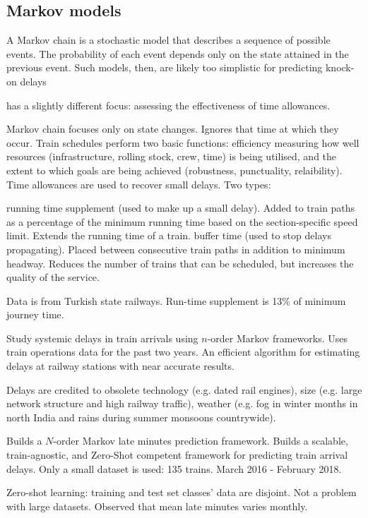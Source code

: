 \documentclass{article}
\begin{document}
\subsection{Markov models}

A Markov chain is a stochastic model that describes a sequence of possible events. The probability of each event depends only on the state attained in the previous event.
Such models, then, are likely too simplistic for predicting knock-on delays

\cite{sahin_et_al} has a slightly different focus: assessing the effectiveness of time allowances.

Markov chain focuses only on state changes. Ignores that time at which they occur. Train schedules perform two basic functions: efficiency measuring how well resources (infrastructure, rolling stock, crew, time) is being utilised, and the extent to which goals are being achieved (robustness, punctuality, relaibility). Time allowances are used to recover small delays. Two types:

running time supplement (used to make up a small delay). Added to train paths as a percentage of the minimum running time based on the section-specific speed limit. Extends the running time of a train. 
buffer time (used to stop delays propagating). Placed between consecutive train paths in addition to minimum headway. Reduces the number of trains that can be scheduled, but increases the quality of the service. 

Data is from Turkish state railways. Run-time supplement is 13\% of minimum journey time. 

\cite{gaurav_et_al_2018}

Study systemic delays in train arrivals using $n$-order Markov frameworks. Uses train operations data for the past two years. An efficient algorithm for estimating delays at railway stations with near accurate results.

Delays are credited to obsolete technology (e.g. dated rail engines), size (e.g. large network structure and high railway traffic), weather (e.g. fog in winter months in north India and rains during summer monsoons countrywide).

Builds a $N$-order Markov late minutes prediction framework. Builds a scalable, train-agnostic, and Zero-Shot competent framework for predicting train arrival delays. Only a small dataset is used: 135 trains. March 2016 - February 2018. 

Zero-shot learning: training and test set classes' data are disjoint. Not a problem with large datasets. Observed that mean late minutes varies monthly. 
\end{document}
